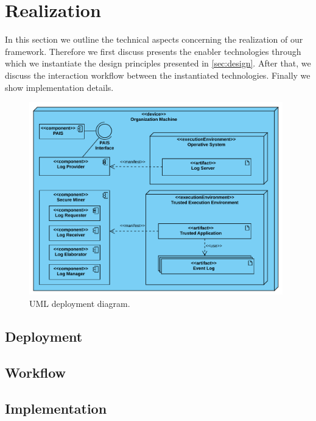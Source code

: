 \section{Realization}
In this section we outline the technical aspects concerning the realization of our framework. Therefore we first discuss presents the enabler technologies through which we instantiate the design principles presented in \cref{sec:design}. After that, we discuss the interaction workflow between the instantiated technologies. Finally we show implementation details.
\begin{figure}[t]
\centering
\includegraphics[width=11cm]{content/figures/deployment_diagram.pdf}
\caption{UML deployment diagram.}
\label{fig:deployment_diagram}
\end{figure}
\subsection{Deployment}

\subsection{Workflow}
\subsection{Implementation}
